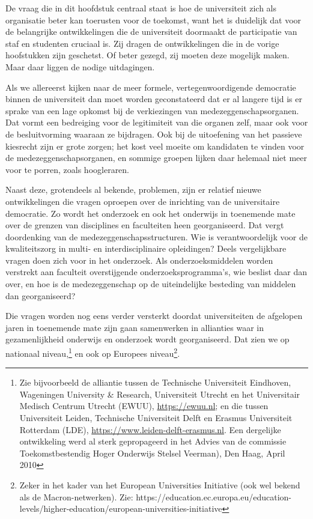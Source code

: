 \documentclass{jote-book}
\begin{document}
	De vraag die in dit hoofdstuk centraal staat is hoe de universiteit zich als organisatie beter kan toerusten voor de toekomst, want het is duidelijk dat voor de belangrijke ontwikkelingen die de universiteit doormaakt de participatie van staf en studenten cruciaal is. Zij dragen de ontwikkelingen die in de vorige hoofstukken zijn geschetst. Of beter gezegd, zij moeten deze mogelijk maken. Maar daar liggen de nodige uitdagingen.



	Als we allereerst kijken naar de meer formele, vertegenwoordigende democratie binnen de universiteit dan moet worden geconstateerd dat er al langere tijd is er sprake van een lage opkomst bij de verkiezingen van medezeggenschapsorganen. Dat vormt een bedreiging voor de legitimiteit van die organen zelf, maar ook voor de besluitvorming waaraan ze bijdragen. Ook bij de uitoefening van het passieve kiesrecht zijn er grote zorgen; het kost veel moeite om kandidaten te vinden voor de medezeggenschapsorganen, en sommige groepen lijken daar helemaal niet meer voor te porren, zoals hoogleraren.



	Naast deze, grotendeels al bekende, problemen, zijn er relatief nieuwe ontwikkelingen die vragen oproepen over de inrichting van de universitaire democratie. Zo wordt het onderzoek en ook het onderwijs in toenemende mate over de grenzen van disciplines en faculteiten heen georganiseerd. Dat vergt doordenking van de medezeggenschapsstructuren. Wie is verantwoordelijk voor de kwaliteitszorg in multi- en interdisciplinaire opleidingen? Deels vergelijkbare vragen doen zich voor in het onderzoek. Als onderzoeksmiddelen worden verstrekt aan faculteit overstijgende onderzoeksprogramma's, wie beslist daar dan over, en hoe is de medezeggenschap op de uiteindelijke besteding van middelen dan georganiseerd?



	Die vragen worden nog eens verder versterkt doordat universiteiten de afgelopen jaren in toenemende mate zijn gaan samenwerken in allianties waar in gezamenlijkheid onderwijs en onderzoek wordt georganiseerd. Dat zien we op nationaal niveau,\footnote{Zie bijvoorbeeld de alliantie tussen de Technische Universiteit Eindhoven, Wageningen University \& Research, Universiteit Utrecht en het Universitair Medisch Centrum Utrecht (EWUU), \href{https://ewuu.nl}{https://ewuu.nl}; en die tussen Universiteit Leiden, Technische Universiteit Delft en Erasmus Universiteit Rotterdam (LDE), \href{https://www.leiden-delft-erasmus.nl}{https://www.leiden-delft-erasmus.nl}. Een dergelijke ontwikkeling werd al sterk gepropageerd in het Advies van de commissie Toekomstbestendig Hoger Onderwijs Stelsel Veerman), Den Haag, April 2010} en ook op Europees niveau\footnote{Zeker in het kader van het European Universities Initiative (ook wel bekend als de Macron-netwerken). Zie: https://education.ec.europa.eu/education-levels/higher-education/european-universities-initiative}.
\end{document}

